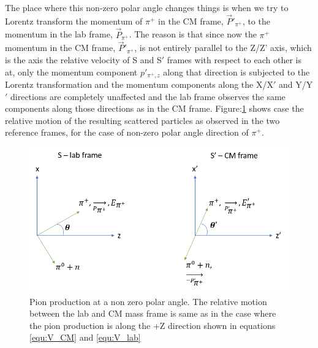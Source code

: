The place where this non-zero polar angle changes things is when we try to Lorentz transform the  momentum of $\pi^+$ in the CM frame, $\vec{P}'_{\pi^+}$, to the momentum in the lab frame, $\vec{P}_{\pi^+}$. The reason is that since now the $\pi^+$ momentum in the CM frame, $\vec{P}'_{\pi^+}$, is not entirely parallel to the Z/Z' axis, which is the axis the relative velocity of S and S$'$ frames with respect to each other is at, only the momentum component  $p'_{\pi^+,z}$ along that direction is subjected to the Lorentz transformation and the momentum components along the X/X$'$ and Y/Y$'$ directions are completely unaffected and the lab frame observes the same components along those directions as in the CM frame. Figure:\ref{fig:pion production at a polar angle} shows case the relative motion of the resulting scattered particles as observed in the two reference frames, for the case of non-zero polar angle direction of $\pi^+$.

\begin{figure}[h!]
    \centering
    \includegraphics[scale=0.75]{Images/kinematic_calc/lab and CM ref frames for polar angle pion prod.png}
    \caption{Pion production at a non zero polar angle. The relative motion between the lab and CM mass frame is same as in the case where the pion production is along the +Z direction shown in equations \ref{equ:V_CM} and \ref{equ:V_lab}}
    \label{fig:pion production at a polar angle}
\end{figure}

